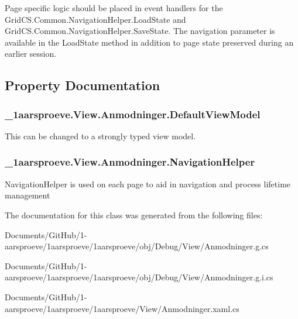 Page specific logic should be placed in event handlers for the Grid\+C\+S.\+Common.\+Navigation\+Helper.\+Load\+State and Grid\+C\+S.\+Common.\+Navigation\+Helper.\+Save\+State. The navigation parameter is available in the Load\+State method in addition to page state preserved during an earlier session. 

\subsection{Property Documentation}
\hypertarget{class__1aarsproeve_1_1_view_1_1_anmodninger_a8544ef30609182b566c238f066e299ea}{}
\subsubsection[{Default\+View\+Model}]{ \+\_\+1aarsproeve.\+View.\+Anmodninger.\+Default\+View\+Model\hspace{0.3cm}{\ttfamily [get]}}\label{class__1aarsproeve_1_1_view_1_1_anmodninger_a8544ef30609182b566c238f066e299ea}


This can be changed to a strongly typed view model. 

\hypertarget{class__1aarsproeve_1_1_view_1_1_anmodninger_ae64ed9357e521d04a9a1e36aaa0e80a9}{}
\subsubsection[{Navigation\+Helper}]{ \+\_\+1aarsproeve.\+View.\+Anmodninger.\+Navigation\+Helper\hspace{0.3cm}{\ttfamily [get]}}\label{class__1aarsproeve_1_1_view_1_1_anmodninger_ae64ed9357e521d04a9a1e36aaa0e80a9}


Navigation\+Helper is used on each page to aid in navigation and process lifetime management 



The documentation for this class was generated from the following files\+:\begin{DoxyCompactItemize}
\item 
Documents/\+Git\+Hub/1-\/aarsproeve/1aarsproeve/1aarsproeve/obj/\+Debug/\+View/Anmodninger.\+g.\+cs\item 
Documents/\+Git\+Hub/1-\/aarsproeve/1aarsproeve/1aarsproeve/obj/\+Debug/\+View/Anmodninger.\+g.\+i.\+cs\item 
Documents/\+Git\+Hub/1-\/aarsproeve/1aarsproeve/1aarsproeve/\+View/Anmodninger.\+xaml.\+cs\end{DoxyCompactItemize}
